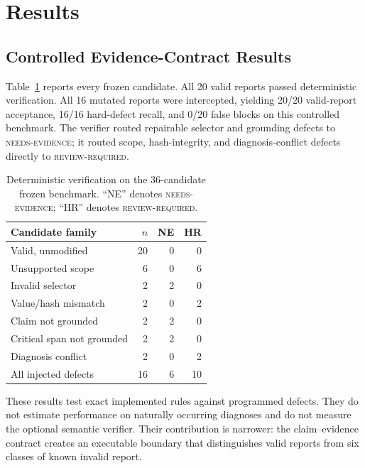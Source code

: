 \section{Results}
\label{sec:results}

\subsection{Controlled Evidence-Contract Results}

Table~\ref{tab:mutation-results} reports every frozen candidate. All 20 valid
reports passed deterministic verification. All 16 mutated reports were
intercepted, yielding 20/20 valid-report acceptance, 16/16 hard-defect recall,
and 0/20 false blocks on this controlled benchmark. The verifier routed
repairable selector and grounding defects to \textsc{needs-evidence}; it routed
scope, hash-integrity, and diagnosis-conflict defects directly to
\textsc{review-required}.

\begin{table}[t]
    \caption{Deterministic verification on the 36-candidate frozen benchmark.
    ``NE'' denotes \textsc{needs-evidence}; ``HR'' denotes
    \textsc{review-required}.}
    \label{tab:mutation-results}
    \centering
    \small
    \begin{tabular}{@{}lrrr@{}}
        \toprule
        Candidate family & $n$ & NE & HR \\
        \midrule
        Valid, unmodified & 20 & 0 & 0 \\
        Unsupported scope & 6 & 0 & 6 \\
        Invalid selector & 2 & 2 & 0 \\
        Value/hash mismatch & 2 & 0 & 2 \\
        Claim not grounded & 2 & 2 & 0 \\
        Critical span not grounded & 2 & 2 & 0 \\
        Diagnosis conflict & 2 & 0 & 2 \\
        \midrule
        All injected defects & 16 & 6 & 10 \\
        \bottomrule
    \end{tabular}
\end{table}

These results test exact implemented rules against programmed defects. They do
not estimate performance on naturally occurring diagnoses and do not measure
the optional semantic verifier. Their contribution is narrower: the
claim--evidence contract creates an executable boundary that distinguishes
valid reports from six classes of known invalid report.

